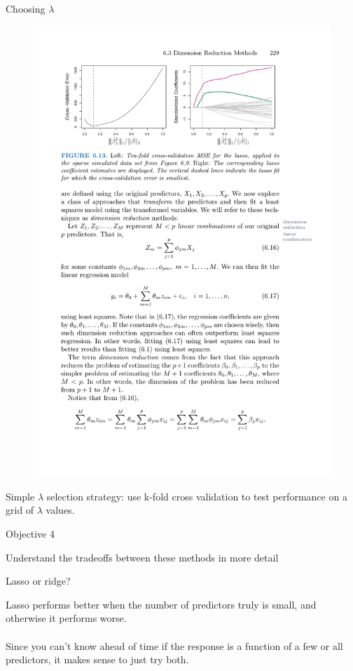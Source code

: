 \documentclass[mathserif, aspectratio=169]{beamer}
\begin{document}
\begin{frame}{Choosing $\lambda$}
\begin{figure}
\includegraphics[scale=.85]{lasso-tenfold}
\end{figure}

\pause

Simple $\lambda$ selection strategy: use k-fold cross validation to test performance on a grid of $\lambda$ values. 


\end{frame}

\begin{frame}{Objective 4}

Understand the tradeoffs between these methods in more detail

\end{frame}

\begin{frame}{Lasso or ridge?}

Lasso performs better when the number of predictors truly is small, and otherwise it performs worse.  \\~\\

Since you can't know ahead of time if the response is a function of a few or all predictors, it makes sense to just try both.  

\end{frame}
\end{document}

